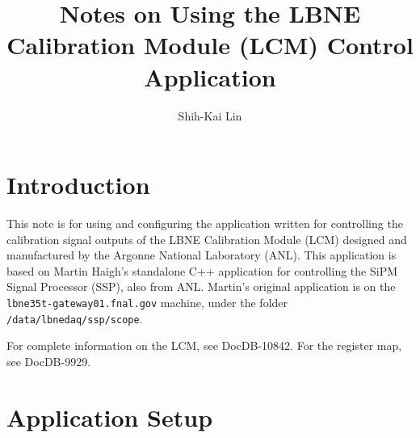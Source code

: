 \documentclass[12pt,a4paper,final]{iopart}
\begin{document}
\title[Notes on Using the LBNE Calibration Module (LCM) Control Application]{Notes on Using the LBNE Calibration Module (LCM) Control Application}

\author[cor1]{Shih-Kai Lin}
\address{Colorado State University}


%


\section{Introduction}

This note is for using and configuring the application written for controlling the calibration signal outputs of the LBNE Calibration Module (LCM) designed and manufactured by the Argonne National Laboratory (ANL). This application is based on Martin Haigh's standalone C++ application for controlling the SiPM Signal Processor (SSP), also from ANL. Martin's original application is on the \texttt{lbne35t-gateway01.fnal.gov} machine, under the folder \texttt{/data/lbnedaq/ssp/scope}.

For complete information on the LCM, see DocDB-10842. For the register map, see DocDB-9929.

\section{Application Setup}
\end{document}
